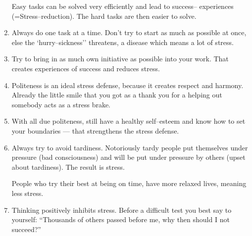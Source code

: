 \documentclass[../main.tex]{subfiles}
\begin{document}
\begin{enumerate}
Easy tasks can be solved very efficiently and lead to success-- experiences (=Stress--reduction). The hard tasks are then easier to solve.
\item Always do one task at a time. Don't try to start as much as possible at once, else the `hurry--sickness'' threatens, a disease which means a lot of stress.
\item Try to bring in as much own initiative as possible into your work. That creates experiences of success and reduces stress.
\item Politeness is an ideal stress defense, because it creates respect and harmony. Already the little smile that you got as a thank you for a helping out somebody acts as a stress brake.
\item With all due politeness, still have a healthy self--esteem and know how to set your boundaries --- that strengthens the stress defense.
\item Always try to avoid tardiness. Notoriously tardy people put themselves under pressure (bad consciousness) and will be put under pressure by others (upset about tardiness). The result is stress. 

People who try their best at being on time, have more relaxed lives, meaning less stress.
\item Thinking positively inhibits stress. Before a difficult test you best say to yourself: ``Thousands of others passed before me, why then should I not succeed?''


\end{enumerate}
\end{document}
